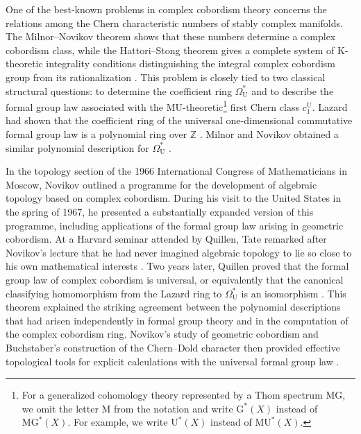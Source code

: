 \documentclass[14pt,dvipsnames]{extarticle}
\numberwithin{equation}{subsection}
\theoremstyle{plain}
\theoremstyle{definition}
\theoremstyle{definition}
\newcommand{\Uu}{\mathrm{U}}
\begin{document}
One of the best-known problems in complex cobordism theory concerns the
relations among the Chern characteristic numbers of stably complex manifolds.
The Milnor--Novikov theorem shows that these numbers determine a complex
cobordism class, while the Hattori--Stong theorem gives a complete system of
$\mathrm{K}$-theoretic integrality conditions distinguishing the integral complex
cobordism group from its rationalization
\cite{Mil60,Nov60,Nov62,Hat66,Sto65}. This problem is closely tied to two
classical structural questions: to determine the coefficient ring
$\Omega_{\mathrm U}^{\ast}$ and to describe the formal group law associated
with the $\mathrm{MU}$-theoretic\footnote{For a generalized cohomology theory
represented by a Thom spectrum $\mathrm{MG}$, we omit the letter $\mathrm M$
from the notation and write $\mathrm{G}^{*}(X)$ instead of
$\mathrm{MG}^{*}(X)$. For example, we write $\Uu^{*}(X)$ instead of
$\mathrm{MU}^{*}(X)$.} first Chern class $c_1^{\mathrm U}$. Lazard had shown
that the coefficient ring of the universal one-dimensional commutative formal
group law is a polynomial ring over $\mathbb Z$ \cite{Laz55}. Milnor and
Novikov obtained a similar polynomial description for
$\Omega_{\mathrm U}^{\ast}$ \cite{Mil60,Nov60,Nov62,Nov67}.

In the topology section of the 1966 International Congress of Mathematicians in Moscow, Novikov outlined a programme for the development of algebraic topology based on complex cobordism. During his visit to the United States in the spring of 1967, he presented a substantially expanded version of this programme, including applications of the formal group law arising in geometric cobordism. At a Harvard seminar attended by Quillen, Tate remarked after Novikov's lecture that he had never imagined algebraic topology to lie so close to his own mathematical interests \cite{Nov11}. Two years later, Quillen proved that the formal group law of complex cobordism is universal, or equivalently that the canonical classifying homomorphism from the Lazard ring to $\Omega_{\mathrm U}^{\ast}$ is an isomorphism \cite{Qui69}. This theorem explained the striking agreement between the polynomial descriptions that had arisen independently in formal group theory and in the computation of the complex cobordism ring. Novikov's study of geometric cobordism and Buchstaber's construction of the Chern--Dold character then provided effective topological tools for explicit calculations with the universal formal group law \cite{Nov60,Nov62,Nov67,Buc70}.
\end{document}
